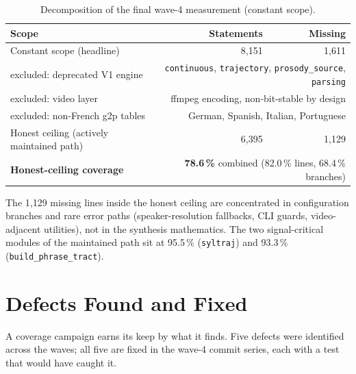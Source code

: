 \documentclass[11pt,a4paper]{article}
\newcommand{\code}[1]{\texttt{#1}}
\newcommand{\pct}[1]{{#1}\,\%}
\begin{document}
\begin{table}[htbp]
\centering
\caption{Decomposition of the final wave-4 measurement (constant scope).}
\label{tab:ceiling}
\small
\begin{tabularx}{\textwidth}{@{ } X r r }
\toprule
Scope & Statements & Missing \\
\midrule
Constant scope (headline) & 8{,}151 & 1{,}611 \\
\quad excluded: deprecated V1 engine & \multicolumn{2}{r}{\code{continuous}, \code{trajectory}, \code{prosody\_source}, \code{parsing}} \\
\quad excluded: video layer & \multicolumn{2}{r}{ffmpeg encoding, non-bit-stable by design} \\
\quad excluded: non-French g2p tables & \multicolumn{2}{r}{German, Spanish, Italian, Portuguese} \\
\midrule
Honest ceiling (actively maintained path) & 6{,}395 & 1{,}129 \\
\textbf{Honest-ceiling coverage} & \multicolumn{2}{r}{\textbf{78.6\,\%} combined (82.0\,\% lines, 68.4\,\% branches)} \\
\bottomrule
\end{tabularx}
\end{table}

The 1{,}129 missing lines inside the honest ceiling are concentrated
in configuration branches and rare error paths (speaker-resolution
fallbacks, CLI guards, video-adjacent utilities), not in the synthesis
mathematics. The two signal-critical modules of the maintained path
sit at \pct{95.5} (\code{syltraj}) and \pct{93.3}
(\code{build\_phrase\_tract}).

\section{Defects Found and Fixed}
\label{sec:defects}

A coverage campaign earns its keep by what it finds. Five defects were
identified across the waves; all five are fixed in the wave-4 commit
series, each with a test that would have caught it.
\end{document}

